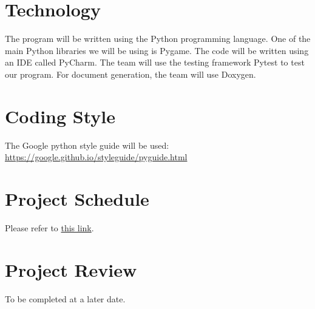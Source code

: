 \documentclass{article}
\begin{document}
\section{Technology}

The program will be written using the Python programming language. One of the main Python libraries we will be using is Pygame. The code will be written using an IDE called PyCharm. The team will use the testing framework Pytest to test our program. For document generation, the team will use Doxygen.

\section{Coding Style}

The Google python style guide will be used: \url{https://google.github.io/styleguide/pyguide.html}

\section{Project Schedule}

Please refer to
\href{https://gitlab.cas.mcmaster.ca/3xa3-l3-g10/3xa3-l3-g10/-/tree/main/ProjectSchedule}{this link}.

\section{Project Review}
To be completed at a later date.
\end{document}

